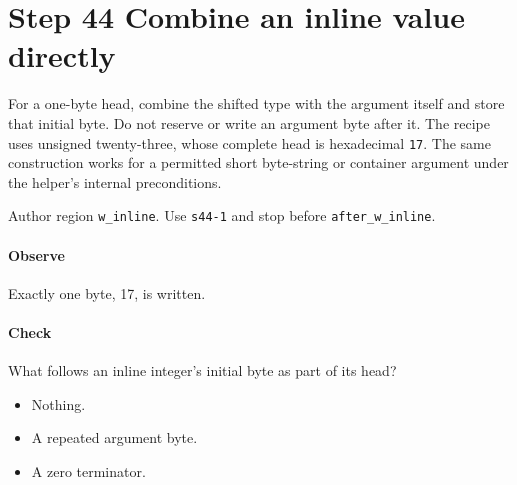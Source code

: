 \section{Step 44 Combine an inline value directly}\label{cbor-s44}
For a one-byte head, combine the shifted type with the argument itself and store that initial byte. Do not reserve or write an argument byte after it. The recipe uses unsigned twenty-three, whose complete head is hexadecimal \texttt{17}. The same construction works for a permitted short byte-string or container argument under the helper's internal preconditions.

Author region \texttt{w\_inline}. Use \texttt{s44-1} and stop before \texttt{after\_w\_inline}.

\paragraph{Observe} Exactly one byte, 17, is written.

\paragraph{Check} What follows an inline integer's initial byte as part of its head?
\begin{itemize}
  \item[A.] Nothing.
  \item[B.] A repeated argument byte.
  \item[C.] A zero terminator.
\end{itemize}
